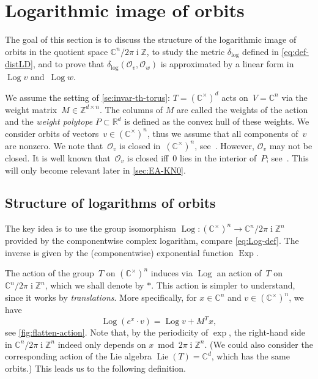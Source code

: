 \documentclass[10pt,a4paper]{article}
\theoremstyle{definition}
\DeclareMathOperator{\ii}{i}
\DeclareMathOperator{\Log}{Log}
\DeclareMathOperator{\Exp}{Exp}
\newcommand{\distLD}{\delta_{\log}}
\DeclareMathOperator{\Lie}{Lie}
\newcommand{\CC}{\mathbb{C}}
\newcommand{\ZZ}{\mathbb{Z}}
\newcommand{\RR}{\mathbb{R}}
\newcommand{\OO}{\ensuremath{\mathcal{O}}}
\numberwithin{equation}{section}
\begin{document}
\section{Logarithmic image of orbits}\label{sec:log}

The goal of this section is to discuss the structure of the logarithmic image of orbits in the quotient space $\CC^n/2\pi\ii\ZZ$,
to study the metric $\distLD$ defined in \eqref{eq:def-distLD},
and to prove that $\distLD(\OO_v,\OO_w)$ is approximated by a linear form in~$\Log v$ and~$\Log w$.


We assume the setting of \cref{se:invar-th-torus}:
$T=(\CC^\times)^d$ acts on~$V=\CC^n$ via the weight matrix~$M\in\ZZ^{d\times n}$.
The columns of $M$ are called the weights of the action and
the \textit{weight polytope} $P\subset\RR^d$ is defined as the convex hull of these weights.
We consider orbits of vectors~$v\in (\CC^\times)^n$, thus we assume that all components of~$v$ are nonzero.
We note that~$\OO_v$ is closed in~$(\CC^\times)^n$,
see~\cite[Prop.~5.1]{torus}.
However, $\OO_v$ may not be closed.
It is well known that~$\OO_v$ is closed iff~$0$ lies in the interior of~$P$;
see~\cite[Section~3]{torus}. This will only become relevant later in \cref{sec:EA-KN0}.


\subsection{Structure of logarithms of orbits}
The key idea is to use the group isomorphism
$\Log \colon (\CC^\times)^n \rightarrow \CC^n/2\pi\ii\ZZ^n$
provided by the componentwise complex logarithm, compare \cref{eq:Log-def}.
The inverse is given by the (componentwise) exponential function $\Exp$.

The action of the group~$T$ on $(\CC^\times)^n$ induces via $\Log$
an action of~$T$ on $\CC^n/2\pi\ii\ZZ^n$, which we shall denote by $\ast$.
This action is simpler to understand, since it works by \textit{translations}.
More specifically, for $x\in \CC^n$ and $v\in(\CC^\times)^n$, we have
\begin{equation}
\label{eq:translation}
	\Log(e^x\cdot v) = \Log v + M^T x ,
\end{equation}
see \cref{fig:flatten-action}.
Note that, by the periodicity of $\exp$, the right-hand side
in $\CC^n/2\pi\ii\ZZ^n$
indeed only depends on $x\bmod 2\pi\ii\ZZ^n$.
(We could also consider the corresponding action of the Lie algebra $\Lie(T)=\CC^d$,
which has the same orbits.)
This leads us to the following definition.
\end{document}
